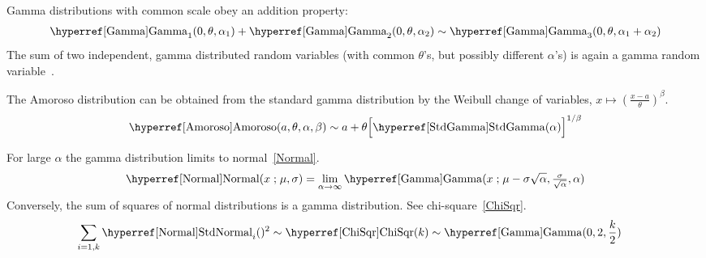 Gamma distributions with common scale obey an addition property:
\begin{align*}
\opr{Gamma}_1(0, \theta, \alpha_1) +  \opr{Gamma}_2(0, \theta,\alpha_2) \sim \opr{Gamma}_3(0, \theta,\alpha_1+\alpha_2)
\checked
\end{align*}
The  sum of two independent, gamma distributed random variables (with common $\theta$'s, but possibly different $\alpha$'s) is again a gamma random variable~\cite{Johnson1994}.

The Amoroso distribution can be obtained from the standard gamma distribution by the Weibull change of variables, $x \mapsto \left(\tfrac{x-a}{\theta}\right)^\beta$.
\[
\opr{Amoroso}(a ,\theta,\alpha,\beta) \sim
a+\theta \Big[{\opr{StdGamma}}(\alpha)\Big]^{1/\beta} 
\checked
\notag
\]


For large $\alpha$ the gamma distribution limits to normal~\eqref{Normal}.
\[
\opr{Normal}(x\given \mu,\sigma)   = 
\lim_{\alpha\rightarrow\infty} \opr{Gamma} (x\given  \mu- \sigma\sqrt{\alpha}, \tfrac{\sigma}{\sqrt{\alpha}}, \alpha)
\checked %
\notag
\]
Conversely, the sum of squares of normal distributions is a gamma distribution. See chi-square~\eqref{ChiSqr}.
\begin{align*}
\sum_{i=1,k}\oprr{StdNormal}{Normal}_i()^{2} & \sim \opr{ChiSqr}(k)  
 \sim \opr{Gamma}(0, 2,\frac{k}{2})  
 \checked
 \notag
\end{align*}



